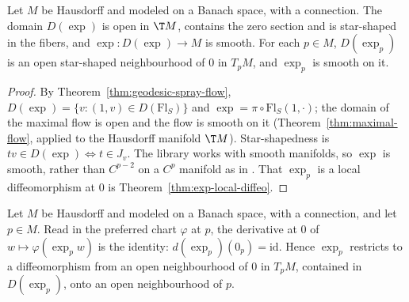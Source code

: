 \begin{theorem}
  \label{thm:exp-smooth}
  \leanok
  Let $M$ be Hausdorff and modeled on a Banach space, with a connection. The domain $D(\exp)$ is
  open in $\T M$, contains the zero section and is star-shaped in the fibers, and
  $\exp\colon D(\exp) \to M$ is smooth. For each $p \in M$, $D(\exp_p)$ is an open star-shaped
  neighbourhood of $0$ in $T_pM$, and $\exp_p$ is smooth on it.
\end{theorem}

\begin{proof}
  \leanok
  By Theorem~\ref{thm:geodesic-spray-flow}, $D(\exp) = \{v : (1, v) \in D(\mathrm{Fl}_S)\}$ and
  $\exp = \pi \circ \mathrm{Fl}_S(1, \cdot)$; the domain of the maximal flow is open and the flow
  is smooth on it (Theorem~\ref{thm:maximal-flow}, applied to the Hausdorff manifold $\T M$).
  Star-shapedness is $tv \in D(\exp) \iff t \in J_v$. The library works with smooth manifolds,
  so $\exp$ is smooth, rather than $C^{p-2}$ on a $C^p$ manifold as in \cite{Lan99}. That
  $\exp_p$ is a local diffeomorphism at $0$ is Theorem~\ref{thm:exp-local-diffeo}.
\end{proof}

\begin{theorem}
  \label{thm:exp-local-diffeo}
  \leanok
  Let $M$ be Hausdorff and modeled on a Banach space, with a connection, and let $p \in M$.
  Read in the preferred chart $\varphi$ at $p$, the derivative at $0$ of
  $w \mapsto \varphi(\exp_p w)$ is the identity: $d(\exp_p)(0_p) = \mathrm{id}$. Hence $\exp_p$
  restricts to a diffeomorphism from an open neighbourhood of $0$ in $T_pM$, contained in
  $D(\exp_p)$, onto an open neighbourhood of $p$.
\end{theorem}

